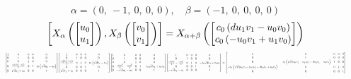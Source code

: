 \documentclass[11pt]{article}
\theoremstyle{definition}
\begin{document}
\[
\alpha = \left( 0, \  -1, \  0, \  0, \  0\right), \quad \beta = \left( -1, \  0, \  0, \  0, \  0\right)
\]
\[
\scaletoalign{\textwidth}{\left[ X_{\alpha}\left(\left[\begin{matrix}u_{0}\\u_{1}\end{matrix}\right]\right), X_{\beta}\left(\left[\begin{matrix}v_{0}\\v_{1}\end{matrix}\right]\right) \right] = X_{\alpha + \beta}\left(\left[\begin{matrix}c_{0} \left(d u_{1} v_{1} - u_{0} v_{0}\right)\\c_{0} \left(- u_{0} v_{1} + u_{1} v_{0}\right)\end{matrix}\right]\right)}
\]
\[
\scaletoalign{\textwidth}{{\left[\begin{matrix}1 & 0 & 0 & 0 & 0\\0 & 1 & 0 & 0 & 0\\0 & 0 & 1 & 0 & 0\\0 & \frac{c_{0} \left(d u_{1}^{2} - u_{0}^{2}\right)}{2} & 0 & 1 & c_{0} \left(\sqrt{d} u_{1} - u_{0}\right)\\0 & \sqrt{d} u_{1} + u_{0} & 0 & 0 & 1\end{matrix}\right]} {\left[\begin{matrix}1 & 0 & 0 & 0 & 0\\0 & 1 & 0 & 0 & 0\\\frac{c_{0} \left(d v_{1}^{2} - v_{0}^{2}\right)}{2} & 0 & 1 & 0 & c_{0} \left(\sqrt{d} v_{1} - v_{0}\right)\\0 & 0 & 0 & 1 & 0\\\sqrt{d} v_{1} + v_{0} & 0 & 0 & 0 & 1\end{matrix}\right]} {\left[\begin{matrix}1 & 0 & 0 & 0 & 0\\0 & 1 & 0 & 0 & 0\\0 & 0 & 1 & 0 & 0\\0 & \frac{c_{0} d u_{1}^{2}}{2} - \frac{c_{0} u_{0}^{2}}{2} & 0 & 1 & - c_{0} \sqrt{d} u_{1} + c_{0} u_{0}\\0 & - \sqrt{d} u_{1} - u_{0} & 0 & 0 & 1\end{matrix}\right]} {\left[\begin{matrix}1 & 0 & 0 & 0 & 0\\0 & 1 & 0 & 0 & 0\\\frac{c_{0} d v_{1}^{2}}{2} - \frac{c_{0} v_{0}^{2}}{2} & 0 & 1 & 0 & - c_{0} \sqrt{d} v_{1} + c_{0} v_{0}\\0 & 0 & 0 & 1 & 0\\- \sqrt{d} v_{1} - v_{0} & 0 & 0 & 0 & 1\end{matrix}\right]} = {\left[\begin{matrix}1 & 0 & 0 & 0 & 0\\0 & 1 & 0 & 0 & 0\\0 & - c_{0} \left(\sqrt{d} \left(u_{0} v_{1} - u_{1} v_{0}\right) + d u_{1} v_{1} - u_{0} v_{0}\right) & 1 & 0 & 0\\- c_{0} \left(\sqrt{d} \left(u_{0} v_{1} - u_{1} v_{0}\right) - d u_{1} v_{1} + u_{0} v_{0}\right) & 0 & 0 & 1 & 0\\0 & 0 & 0 & 0 & 1\end{matrix}\right]}}
\]
\end{document}
